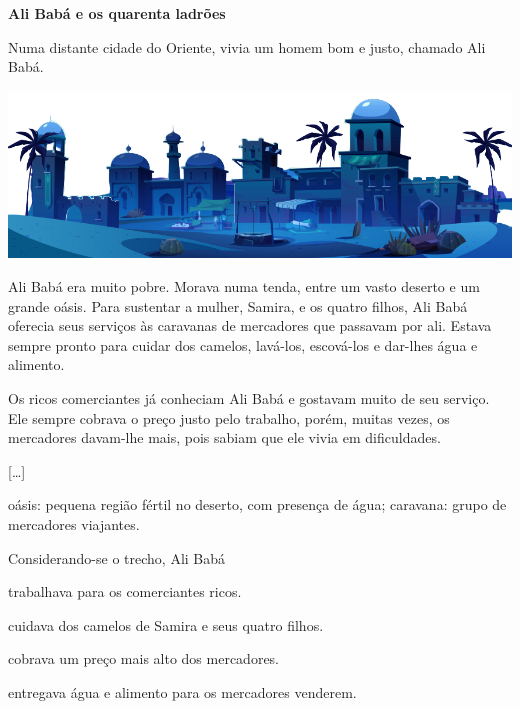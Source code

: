 \begin{myquote}
\textbf{Ali Babá e os quarenta ladrões}

Numa distante cidade do Oriente, vivia um homem bom e justo, chamado Ali
Babá.

\begin{center}
\includegraphics[width=\textwidth]{./media/image23q.png}
\end{center}

Ali Babá era muito pobre. Morava numa tenda, entre um vasto deserto e um
grande oásis. Para sustentar a mulher, Samira, e os quatro filhos, Ali
Babá oferecia seus serviços às caravanas de mercadores que passavam por
ali. Estava sempre pronto para cuidar dos camelos, lavá-los, escová-los
e dar-lhes água e alimento.

Os ricos comerciantes já conheciam Ali Babá e gostavam muito de seu
serviço. Ele sempre cobrava o preço justo pelo trabalho, porém, muitas
vezes, os mercadores davam-lhe mais, pois sabiam que ele vivia em
dificuldades.

{[}\ldots{}{]}


\begin{small}
 oásis: pequena região fértil no deserto, com presença de água; 
caravana: grupo de mercadores viajantes.
\end{small}
\end{myquote}

Considerando-se o trecho, Ali Babá

\begin{escolha}
\item trabalhava para os comerciantes ricos.

\item cuidava dos camelos de Samira e seus quatro filhos.

\item cobrava um preço mais alto dos mercadores.

\item entregava água e alimento para os mercadores venderem.
\end{escolha}

